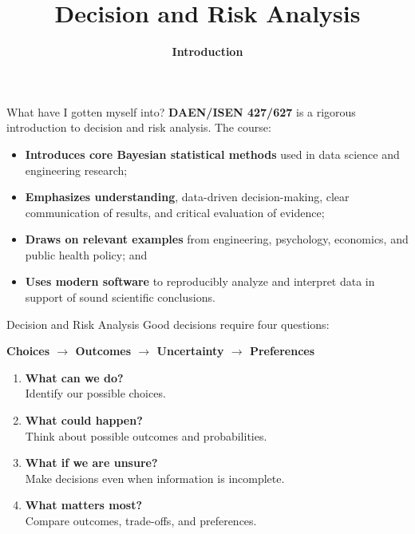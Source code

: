 \documentclass[12pt]{beamer}
\title{Decision and Risk Analysis}
\subtitle{\textbf{Introduction}}
\author{\emph{}}
\date{\color{aggiemaroon}{
DAEN 427/ISEN 427/ISEN 627\\
\textbf{Alexander Abuabara}\\
Fall 2026
}}
\newcommand{\vocab}[1]{\textcolor{AggieMaroon}{\textbf{#1}}}
\begin{document}
\maketitle

\begin{frame}{}
\begin{block}{What have I gotten myself into?}
\textbf{DAEN/ISEN 427/627} is a rigorous introduction to decision and risk analysis.
The course:
\begin{itemize}
    \item \vocab{Introduces core Bayesian statistical methods} used in data science and engineering research;
    \item \vocab{Emphasizes understanding}, data-driven decision-making, clear communication of results, and critical evaluation of evidence;
    \item \vocab{Draws on relevant examples} from engineering, psychology, economics, and public health policy; and
    \item \vocab{Uses modern software} to reproducibly analyze and interpret data in support of sound scientific conclusions.
\end{itemize}
\end{block}
\end{frame}

\begin{frame}{}
\begin{block}{Decision and Risk Analysis}
Good decisions require four questions:
\begin{center}
\large
\vocab{Choices $\rightarrow$ Outcomes $\rightarrow$ Uncertainty $\rightarrow$ Preferences}
\end{center}

\pause

\begin{enumerate}
\item \vocab{What can we do?}\\Identify our possible choices.
\item \vocab{What could happen?}\\Think about possible outcomes and probabilities.
\item \vocab{What if we are unsure?}\\Make decisions even when information is incomplete.
\item \vocab{What matters most?}\\Compare outcomes, trade-offs, and preferences.
\end{enumerate}
\end{block}
\end{frame}
\end{document}
